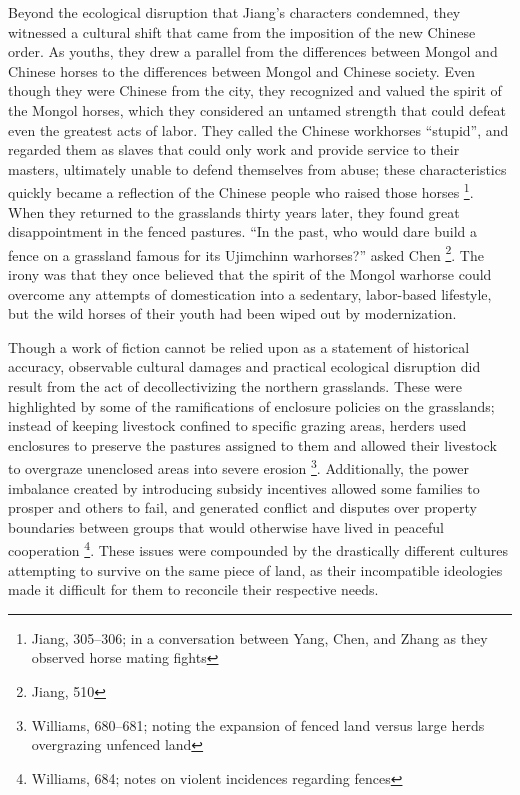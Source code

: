 Beyond the ecological disruption that Jiang's characters condemned,
they witnessed a cultural shift that came from the imposition of the
new Chinese order. As youths, they drew a parallel from the differences
between Mongol and Chinese horses to the differences between Mongol and
Chinese society. Even though they were Chinese from the city, they
recognized and valued the spirit of the Mongol horses, which they
considered an untamed
strength that could defeat even the greatest acts of labor. They called
the Chinese workhorses ``stupid'', and regarded them as slaves that could
only work and provide service to their masters, ultimately unable to defend
themselves from abuse; these characteristics quickly became a
reflection of the Chinese people who raised those horses
\footnote{Jiang, 305--306; in a conversation between Yang, Chen, and
Zhang as they observed horse mating fights}. When they returned to the grasslands thirty years later, they
found great disappointment in the fenced pastures. ``In the past,
who would dare build a fence on a grassland famous for its Ujimchinn
warhorses?'' asked Chen \footnote{Jiang, 510}. The irony was that they
once believed that the spirit of the Mongol warhorse could overcome any
attempts of domestication into a sedentary, labor-based lifestyle, but
the wild horses of their youth had been wiped out by modernization. 

Though a work of fiction cannot be relied upon as a statement of
historical accuracy, observable cultural damages and practical
ecological disruption did result from the act of
decollectivizing the northern grasslands. These were highlighted by some of the
ramifications of enclosure policies on the grasslands; instead of
keeping livestock confined to specific grazing areas, herders used
enclosures to preserve the pastures assigned to them and allowed their
livestock to overgraze unenclosed areas into severe erosion
\footnote{Williams, 680--681; noting the expansion of fenced land
versus large herds overgrazing unfenced land}. Additionally, the power imbalance
created by introducing subsidy incentives allowed some families to
prosper and
others to fail, and generated conflict and disputes over property
boundaries between groups that would otherwise have lived in peaceful
cooperation \footnote{Williams, 684; notes on violent incidences regarding fences}. These issues were compounded by the drastically different cultures attempting to survive on the same piece of land, as their incompatible ideologies made it difficult for them to reconcile their respective needs.

